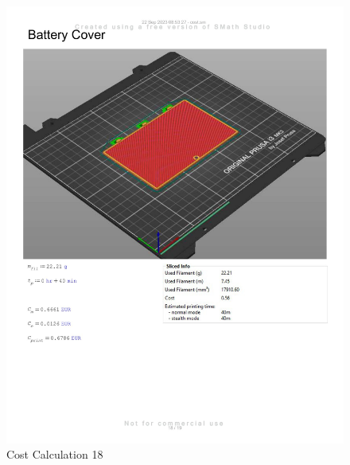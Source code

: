 \begin{figure}[H]
    \centering
    \includegraphics[width=\linewidth]{texs/appendix/data/costcalculation/cost1-18.jpg}
    \caption{Cost Calculation 18}
    \label{fig:cost-calculation-18}
\end{figure}


